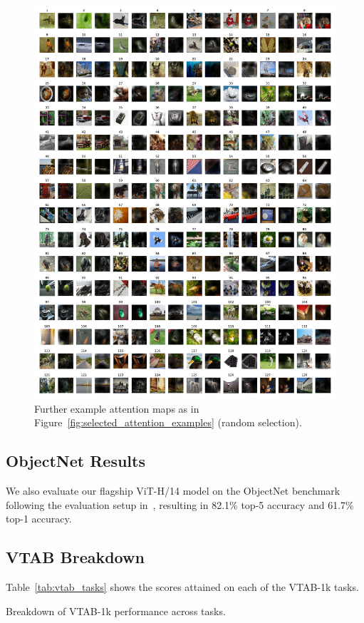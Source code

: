 \begin{figure}[h]
\begin{center}
\includegraphics[width=\textwidth]{images/visualizations/20201002_batch_attention_examples_compressed.pdf}
\end{center}
\caption{Further example attention maps as in Figure~\ref{fig:selected_attention_examples} (random selection).}
\label{fig:batch_attention_examples}
\end{figure}

\subsection{ObjectNet Results}
We also evaluate our flagship ViT-H/14 model on the ObjectNet benchmark following the evaluation setup in~\cite{kolesnikov2020-bit}, resulting in 82.1\% top-5 accuracy and 61.7\% top-1 accuracy.

\subsection{VTAB Breakdown}
Table~\ref{tab:vtab_tasks} shows the scores attained on each of the VTAB-1k tasks.

\begin{table}[ht]
\centering
\caption{
Breakdown of VTAB-1k performance across tasks.
}

\label{tab:vtab_tasks}
\end{table}